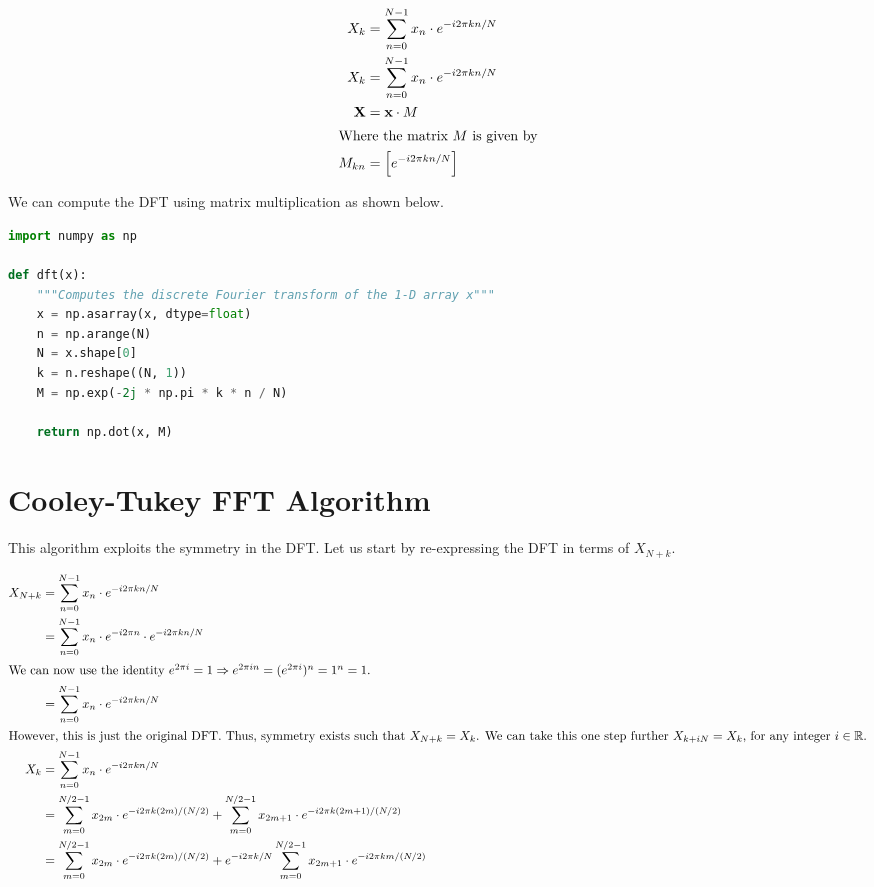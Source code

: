 \documentclass{article}
\begin{document}
\begin{align*}
    X_k &= \sum_{n=0}^{N-1} x_n \cdot e^{-i 2 \pi k n / N}\\
    X_k &= \sum_{n=0}^{N-1} x_n \cdot e^{-i 2 \pi k n / N}\\
    \textbf{X} &= \textbf{x} \cdot M\\
    \intertext{Where the matrix $M$ is given by}
    M_{kn} &= \left[ e^{-i 2 \pi k n / N} \right]
\end{align*}

\newpage
\thispagestyle{fancy}
We can compute the DFT using matrix multiplication as shown below.
\begin{lstlisting}[language=Python, caption=Na\"{i}ve implementation of the DFT]
import numpy as np

def dft(x):
    """Computes the discrete Fourier transform of the 1-D array x"""
    x = np.asarray(x, dtype=float)
    n = np.arange(N)
    N = x.shape[0]
    k = n.reshape((N, 1))
    M = np.exp(-2j * np.pi * k * n / N)

    return np.dot(x, M)
\end{lstlisting}


\section*{Cooley-Tukey FFT Algorithm}
This algorithm exploits the symmetry in the DFT. Let us start by re-expressing the DFT in terms of $X_{N+k}$.\vspace{-1em}

\begin{align*}
    X_{N+k} &= \sum_{n=0}^{N-1} x_n \cdot e^{-i 2 \pi k n / N}\\
    &= \sum_{n=0}^{N-1} x_n \cdot e^{-i 2\pi n} \cdot e^{-i 2\pi k n / N}\\
    \intertext{We can now use the identity $e^{ 2\pi i} = 1 \Rightarrow e^{2\pi i n} = (e^{2\pi i})^n = 1^n = 1$.}
    &= \sum_{n=0}^{N-1} x_n \cdot e^{-i 2\pi k n / N}\\
    \intertext{However, this is just the original DFT. Thus, symmetry exists such that $X_{N+k} = X_k$. We can take this one step further $X_{k + iN} = X_k$, for any integer $i \in \mathbb{R}$.}
    X_k &= \sum_{n=0}^{N-1} x_n \cdot e^{-i 2\pi k n/N}\\
    &= \sum_{m=0}^{N/2 - 1} x_{2m} \cdot e^{-i2\pi k(2m)/(N/2)} + \sum_{m=0}^{N/2 - 1} x_{2m + 1} \cdot e^{-i2\pi k(2m + 1)/ (N/2)}\\
    &= \sum_{m=0}^{N/2 - 1} x_{2m} \cdot e^{-i2\pi k(2m)/(N/2)} + e^{-i 2\pi k/N} \sum_{m=0}^{N/2 - 1} x_{2m + 1} \cdot e^{-i2\pi k  m/ (N/2)}\\
\end{align*}
\end{document}
